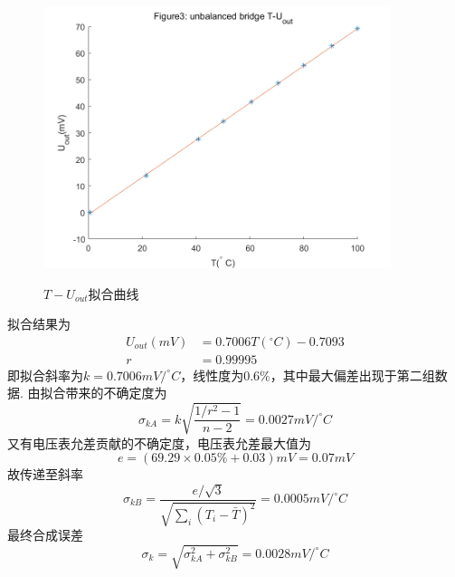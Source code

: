 \documentclass[12pt, a4paper]{ctexart}
\begin{document}
\begin{figure}[htbp]
    \centering
    \caption{$T-U_{out}$拟合曲线}
    \includegraphics[width=4in]{figure/T-U_out figure.png}
    \label{fig3}
\end{figure}

拟合结果为
\begin{align*}
    U_{out}(mV) &= 0.7006T(^{\circ} C) - 0.7093 \\
    r &= 0.99995
\end{align*}
即拟合斜率为$k = 0.7006 mV/^{\circ}C$，线性度为0.6\%，其中最大偏差出现于第二组数据.
由拟合带来的不确定度为
\begin{equation*}
    \sigma_{kA} = k \sqrt{\frac{1/r^2 - 1}{n - 2}} = 0.0027 mV/^{\circ}C
\end{equation*}
又有电压表允差贡献的不确定度，电压表允差最大值为
\begin{equation*}
    e = (69.29 \times 0.05\% + 0.03)mV = 0.07mV
\end{equation*}
故传递至斜率
\begin{equation*}
    \sigma_{kB} = \frac{e/\sqrt{3}}{\sqrt{\sum_{i}(T_i - \bar{T})^2}} = 0.0005 mV/^{\circ}C
\end{equation*}
最终合成误差
\begin{equation*}
    \sigma_k = \sqrt{\sigma_{kA}^2 + \sigma_{kB}^2} = 0.0028 mV/^{\circ}C
\end{equation*}
\end{document}

